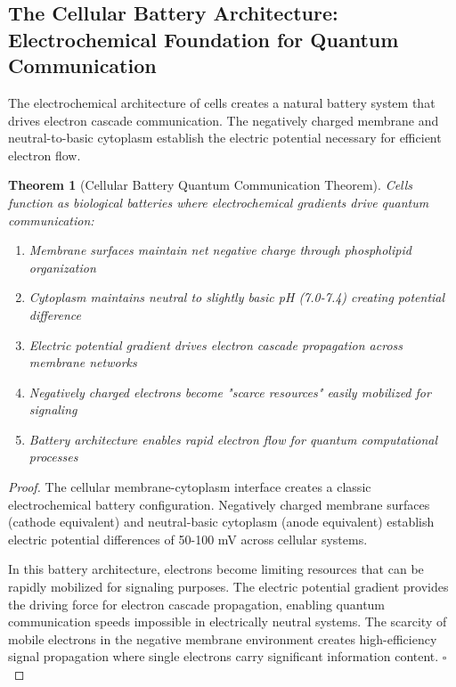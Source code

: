 \documentclass[12pt,a4paper]{article}
\newtheorem{theorem}{Theorem}
\begin{document}
\subsection{The Cellular Battery Architecture: Electrochemical Foundation for Quantum Communication}

The electrochemical architecture of cells creates a natural battery system that drives electron cascade communication. The negatively charged membrane and neutral-to-basic cytoplasm establish the electric potential necessary for efficient electron flow.

\begin{theorem}[Cellular Battery Quantum Communication Theorem]
Cells function as biological batteries where electrochemical gradients drive quantum communication:
\begin{enumerate}
\item Membrane surfaces maintain net negative charge through phospholipid organization
\item Cytoplasm maintains neutral to slightly basic pH (7.0-7.4) creating potential difference
\item Electric potential gradient drives electron cascade propagation across membrane networks
\item Negatively charged electrons become "scarce resources" easily mobilized for signaling
\item Battery architecture enables rapid electron flow for quantum computational processes
\end{enumerate}
\end{theorem}

\begin{proof}
The cellular membrane-cytoplasm interface creates a classic electrochemical battery configuration. Negatively charged membrane surfaces (cathode equivalent) and neutral-basic cytoplasm (anode equivalent) establish electric potential differences of 50-100 mV across cellular systems.

In this battery architecture, electrons become limiting resources that can be rapidly mobilized for signaling purposes. The electric potential gradient provides the driving force for electron cascade propagation, enabling quantum communication speeds impossible in electrically neutral systems. The scarcity of mobile electrons in the negative membrane environment creates high-efficiency signal propagation where single electrons carry significant information content. $\square$
\end{proof}
\end{document}

